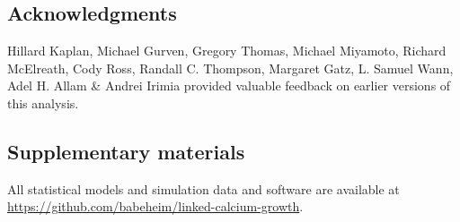 \documentclass[aps,pre,twocolumn,twoside,tightenlines,groupedaddress,amsmath,amssymb,nobibnotes,final,showkeys,letterpaper]{revtex4-2}
\begin{document}
\subsection*{Acknowledgments}

Hillard Kaplan, Michael Gurven, Gregory Thomas, Michael Miyamoto, Richard McElreath, Cody Ross, Randall C. Thompson, Margaret Gatz, L. Samuel Wann, Adel H. Allam \& Andrei Irimia provided valuable feedback on earlier versions of this analysis.

\subsection*{Supplementary materials}

All statistical models and simulation data and software are available at \href{https://github.com/babeheim/linked-calcium-growth}{https://github.com/babeheim/linked-calcium-growth}.

\newpage

\end{document}
